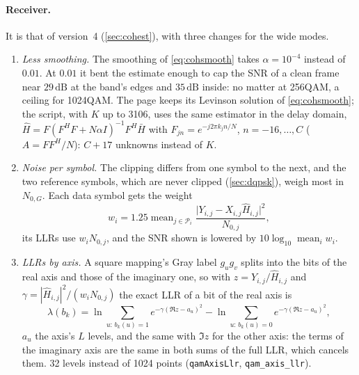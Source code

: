 \documentclass[11pt,a4paper]{article}
\newcommand{\dB}{\,\mathrm{dB}}
\newcommand{\code}[1]{\texttt{#1}}
\theoremstyle{remark}
\begin{document}
\paragraph{Receiver.}
It is that of version~4 (\cref{sec:cohest}), with three changes for the wide modes.
\begin{enumerate}
\item \emph{Less smoothing.} The smoothing of \cref{eq:cohsmooth} takes $\alpha = 10^{-4}$ instead of $0.01$. At $0.01$ it bent the estimate enough to cap the SNR of a clean frame near $29\dB$ at the band's edges and $35\dB$ inside: no matter at 256QAM, a ceiling for 1024QAM. The page keeps its Levinson solution of \cref{eq:cohsmooth}; the script, with $K$ up to 3106, uses the same estimator in the delay domain, $\hat H = F (F^H F + N\alpha I)^{-1} F^H \bar H$ with $F_{jn} = e^{-j2\pi k_j n/N}$, $n = -16, \dots, C$ ($A = F F^H/N$): $C + 17$ unknowns instead of $K$.
\item \emph{Noise per symbol.} The clipping differs from one symbol to the next, and the two reference symbols, which are never clipped (\cref{sec:dqpsk}), weigh most in $N_{0,G}$. Each data symbol gets the weight
\begin{equation}
w_i = 1.25 \operatorname{mean}_{j \in \mathcal P_i} \frac{\bigl|Y_{i,j} - X_{i,j} \hat H_{i,j}\bigr|^2}{N_{0,j}},
\end{equation}
its LLRs use $w_i N_{0,j}$, and the SNR shown is lowered by $10\log_{10} \operatorname{mean}_i w_i$.
\item \emph{LLRs by axis.} A square mapping's Gray label $g_u g_v$ splits into the bits of the real axis and those of the imaginary one, so with $z = Y_{i,j}/\hat H_{i,j}$ and $\gamma = |\hat H_{i,j}|^2/(w_i N_{0,j})$ the exact LLR of a bit of the real axis is
\begin{equation}
\lambda(b_k) = \ln \sum_{u:\, b_k(u) = 1} e^{-\gamma (\Re z - a_u)^2} - \ln \sum_{u:\, b_k(u) = 0} e^{-\gamma (\Re z - a_u)^2},
\end{equation}
$a_u$ the axis's $L$ levels, and the same with $\Im z$ for the other axis: the terms of the imaginary axis are the same in both sums of the full LLR, which cancels them. 32 levels instead of 1024 points (\code{qamAxisLlr}, \code{qam\_axis\_llr}).
\end{enumerate}
\end{document}
